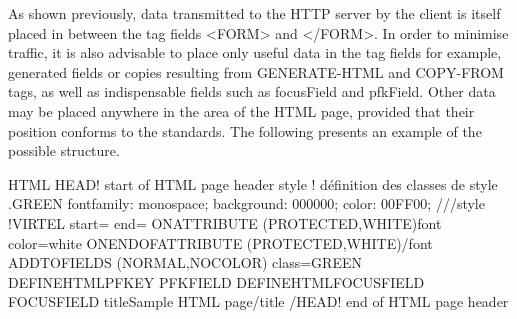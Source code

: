 \documentclass[letterpaper,10pt,english]{sphinxmanual}
\begin{document}
As shown previously, data transmitted to the HTTP server by the client is itself placed in between the tag fields \textless{}FORM\textgreater{} and \textless{}/FORM\textgreater{}. In order to minimise traffic, it is also advisable to place only useful data in the tag fields for example, generated fields or copies resulting from GENERATE-HTML and COPY-FROM tags, as well as indispensable fields such as focusField and pfkField. Other data may be placed anywhere in the area of the HTML page, provided that their position conforms to the standards. The following presents an example of the possible structure.

\begin{sphinxVerbatim}[commandchars=\\\{\}]
\PYGZlt{}HTML\PYGZgt{}
\PYGZlt{}HEAD\PYGZgt{}\PYGZlt{}!\PYGZhy{}\PYGZhy{}\PYGZhy{}\PYGZhy{}\PYGZhy{}\PYGZhy{}\PYGZhy{}\PYGZhy{}\PYGZhy{}\PYGZhy{}\PYGZhy{}\PYGZhy{}\PYGZhy{}\PYGZhy{}\PYGZhy{}\PYGZhy{}\PYGZhy{}\PYGZhy{} start of HTML page header    \PYGZhy{}\PYGZhy{}\PYGZhy{}\PYGZhy{}\PYGZhy{}\PYGZhy{}\PYGZhy{}\PYGZhy{}\PYGZhy{}\PYGZhy{}\PYGZhy{}\PYGZhy{}\PYGZhy{}\PYGZhy{}\PYGZhy{}\PYGZhy{}\PYGZhy{}\PYGZhy{}\PYGZhy{}\PYGZhy{}\PYGZgt{}
\PYGZlt{}style\PYGZgt{}
\PYGZlt{}!\PYGZhy{}\PYGZhy{} définition des classes de style
    .GREEN \PYGZob{}font\PYGZhy{}family: monospace; background: \PYGZsh{}000000; color: \PYGZsh{}00FF00; \PYGZcb{}
//\PYGZhy{}\PYGZhy{}\PYGZgt{}\PYGZlt{}/style\PYGZgt{}
\PYGZlt{}!\PYGZhy{}\PYGZhy{}VIRTEL start=\PYGZdq{}\PYGZob{}\PYGZob{}\PYGZob{}\PYGZdq{} end=\PYGZdq{}\PYGZcb{}\PYGZcb{}\PYGZcb{}\PYGZdq{} \PYGZhy{}\PYGZhy{}\PYGZgt{}
\PYGZob{}\PYGZob{}\PYGZob{}ON\PYGZhy{}ATTRIBUTE (PROTECTED,WHITE)\PYGZlt{}font color=white\PYGZgt{}\PYGZcb{}\PYGZcb{}\PYGZcb{}
\PYGZob{}\PYGZob{}\PYGZob{}ON\PYGZhy{}END\PYGZhy{}OF\PYGZhy{}ATTRIBUTE (PROTECTED,WHITE)\PYGZlt{}/font\PYGZgt{}\PYGZcb{}\PYGZcb{}\PYGZcb{}
\PYGZob{}\PYGZob{}\PYGZob{}ADD\PYGZhy{}TO\PYGZhy{}FIELDS (NORMAL,NOCOLOR) class=\PYGZdq{}GREEN\PYGZdq{} \PYGZcb{}\PYGZcb{}\PYGZcb{}
\PYGZob{}\PYGZob{}\PYGZob{}DEFINE\PYGZhy{}HTML\PYGZhy{}PFKEY \PYGZdq{}PFKFIELD\PYGZdq{}\PYGZcb{}\PYGZcb{}\PYGZcb{}
\PYGZob{}\PYGZob{}\PYGZob{}DEFINE\PYGZhy{}HTML\PYGZhy{}FOCUS\PYGZhy{}FIELD \PYGZdq{}FOCUSFIELD\PYGZdq{}\PYGZcb{}\PYGZcb{}\PYGZcb{}
\PYGZlt{}title\PYGZgt{}Sample HTML page\PYGZlt{}/title\PYGZgt{}
\PYGZlt{}/HEAD\PYGZgt{}\PYGZlt{}!\PYGZhy{}\PYGZhy{}\PYGZhy{}\PYGZhy{}\PYGZhy{}\PYGZhy{}\PYGZhy{}\PYGZhy{}\PYGZhy{}\PYGZhy{}\PYGZhy{}\PYGZhy{}\PYGZhy{}\PYGZhy{}\PYGZhy{}\PYGZhy{}\PYGZhy{}\PYGZhy{} end of HTML page header    \PYGZhy{}\PYGZhy{}\PYGZhy{}\PYGZhy{}\PYGZhy{}\PYGZhy{}\PYGZhy{}\PYGZhy{}\PYGZhy{}\PYGZhy{}\PYGZhy{}\PYGZhy{}\PYGZhy{}\PYGZhy{}\PYGZhy{}\PYGZhy{}\PYGZhy{}\PYGZhy{}\PYGZhy{}\PYGZhy{}\PYGZgt{}


\end{sphinxVerbatim}
\end{document}
